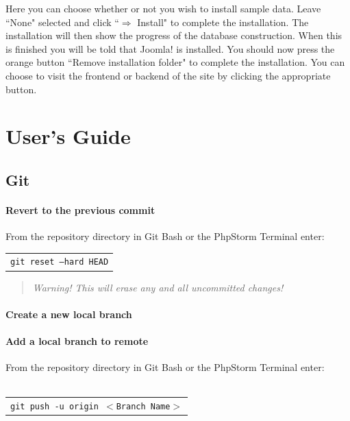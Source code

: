 \documentclass[]{report}
\begin{document}
\noindent
Here you can choose whether or not you wish to install sample data. Leave ``None" selected and click ``$\Rightarrow$ Install" to complete the installation. The installation will then show the progress of the database construction. When this is finished you will be told that Joomla! is installed. You should now press the orange button ``Remove installation folder" to complete the installation. You can choose to visit the frontend or backend of the site by clicking the appropriate button.

\chapter{User's Guide}

\section{Git}

\subsubsection{Revert to the previous commit}
From the repository directory in Git Bash or the PhpStorm Terminal enter:\\

\begin{tabular}{l}
	\texttt{git reset --hard HEAD}\\
\end{tabular}

\begin{quote}
	\emph{Warning! This will erase any and all uncommitted changes!}
\end{quote}

\subsubsection{Create a new local branch}

\subsubsection{Add a local branch to remote}
From the repository directory in Git Bash or the PhpStorm Terminal enter:\\
\\
\begin{tabular}{l}
	\texttt{git push -u origin $<$Branch Name$>$}
\end{tabular}
\end{document}
